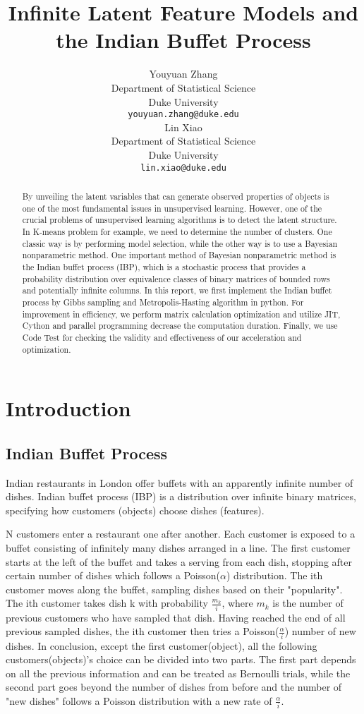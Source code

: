 \documentclass{article}
\title{Infinite Latent Feature Models and the Indian Buffet Process}
\author{
Youyuan Zhang \\
Department of Statistical Science\\
Duke University\\
\texttt{youyuan.zhang@duke.edu} \\
\And
Lin Xiao \\
Department of Statistical Science\\
Duke University \\
\texttt{lin.xiao@duke.edu} \\
}
\begin{document}
\maketitle


\begin{abstract}
By unveiling the latent variables that can generate observed properties of objects is one of the most fundamental issues in unsupervised learning. However, one of the crucial problems of unsupervised learning algorithms is to detect the latent structure. In K-means problem for example, we need to determine the number of clusters. One classic way is by performing model selection, while the other way is to use a Bayesian nonparametric method. One important method of Bayesian nonparametric method is the Indian buffet process (IBP), which is a stochastic process that provides a probability distribution over equivalence classes of binary matrices of bounded rows and potentially infinite columns. In this report, we first implement the Indian buffet process by Gibbs sampling and Metropolis-Hasting algorithm in python. For improvement in efficiency, we perform matrix calculation optimization and utilize JIT, Cython and parallel programming decrease the computation duration. Finally, we use Code Test for checking the validity and effectiveness of our acceleration and optimization. 
\end{abstract}


\section{Introduction}


\subsection{Indian Buffet Process}

Indian restaurants in London offer buffets with an apparently infinite number of dishes. Indian buffet process (IBP) is a distribution over infinite binary matrices, specifying how customers (objects) choose dishes (features).

N customers enter a restaurant one after another. Each customer is exposed to a buffet consisting of infinitely many dishes arranged in a line. The first customer starts at the left of the buffet and takes a serving from each dish, stopping after certain number of dishes which follows a Poisson($\alpha$) distribution. The ith customer moves along the buffet, sampling dishes based on their "popularity". The ith customer takes dish k with probability $\frac{m_k}{i}$, where $m_k$ is the number of previous customers who have sampled that dish. Having reached the end of all previous sampled dishes, the ith customer then tries a Poisson($\frac{\alpha}{i}$) number of new dishes. In conclusion, except the first customer(object), all the following customers(objects)'s choice can be divided into two parts. The first part depends on all the previous information and can be treated as Bernoulli trials, while the second part goes beyond the number of dishes from before and the number of "new dishes" follows a Poisson distribution with a new rate of $\frac{\alpha}{i}$.
\end{document}

